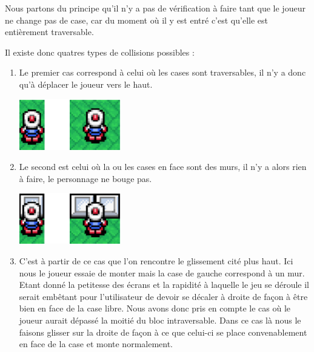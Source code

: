 \begin{enumerate}
				  		
				  		Nous partons du principe qu'il n'y a pas de vérification à faire tant
				  		que le joueur ne change pas de case, car du moment où il y est entré
				  		c'est qu'elle est entièrement traversable.
				  		
				  		Il existe donc quatres types de collisions possibles :
				  		
				  		\begin{enumerate}

				  		  \item Le premier cas correspond à celui où les cases sont
				  		  traversables, il n'y a donc qu'à déplacer le joueur vers le haut.

							\begin{center}						
								\includegraphics[width=168px,height=84px]{Developpement/Img/ok2.eps}
							\end{center}

				  		  \item Le second est celui où la ou les cases en face sont des murs, il
				  		  n'y a alors rien à faire, le personnage ne bouge pas.
				  		  				  		  
				  		  	\begin{center}						
								\includegraphics[width=168px,height=84px]{Developpement/Img/ko2.eps}
							\end{center}
							
				  		  \item C'est à partir de ce cas que l'on rencontre le glissement cité
				  		  plus haut.
				  		  Ici nous le joueur essaie de monter mais la case de gauche correspond à un
				  		  mur. Etant donné la petitesse des écrans et la rapidité à laquelle le
				  		  jeu se déroule il serait embêtant pour l'utilisateur de devoir se
				  		  décaler à droite de façon à être bien en face de la case libre.
				  		  Nous avons donc pris en compte le cas où le joueur aurait dépassé la
				  		  moitié du bloc intraversable. Dans ce cas là nous le faisons glisser
				  		  sur la droite de façon à ce que celui-ci se place convenablement en
				  		  face de la case et monte normalement.
				  		  

\end{enumerate}
\end{enumerate}
